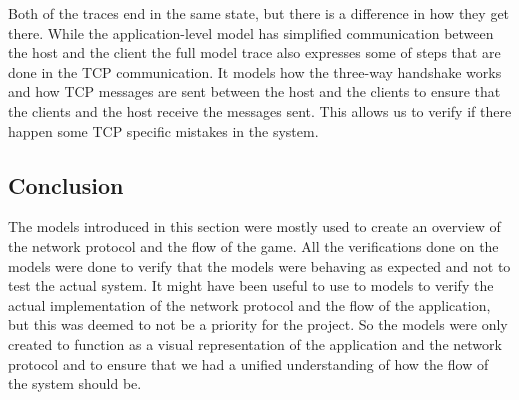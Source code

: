 Both of the traces end in the same state, but there is a difference in how they get there.
While the application-level model has simplified communication between the host and the client the full model trace also expresses some of steps that are done in the TCP communication.
It models how the three-way handshake works and how TCP messages are sent between the host and the clients to ensure that the clients and the host receive the messages sent.
This allows us to verify if there happen some TCP specific mistakes in the system.

\subsection{Conclusion}
The models introduced in this section were mostly used to create an overview of the network protocol and the flow of the game.
All the verifications done on the models were done to verify that the models were behaving as expected and not to test the actual system.
It might have been useful to use to models to verify the actual implementation of the network protocol and the flow of the application, but this was deemed to not be a priority for the project.
So the models were only created to function as a visual representation of the application and the network protocol and to ensure that we had a unified understanding of how the flow of the system should be.

